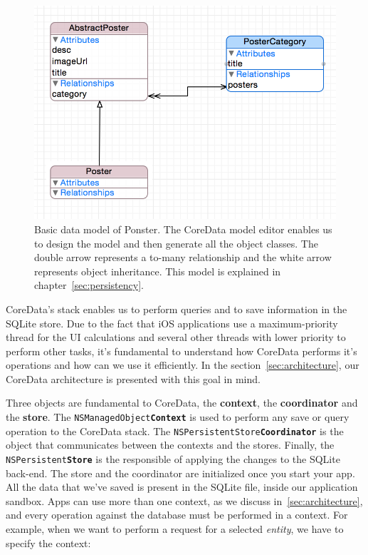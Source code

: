 \begin{figure}
\centering
\includegraphics[scale=0.85]{img/coredata.png}
\caption{\label{fig:coredata}Basic data model of Ponster. The CoreData model editor
  enables us to design the model and then generate all the object classes. The
  double arrow represents a to-many relationship and the white arrow represents
  object inheritance. This model is explained in chapter~\ref{sec:persistency}.}
\end{figure} 

CoreData's stack enables us to perform queries and to save information in the SQLite
store. Due to the fact that iOS applications use a maximum-priority thread for the
UI calculations and several other threads with lower priority to perform other
tasks, it's fundamental to understand how CoreData performs it's operations and how
can we use it efficiently. In the section~\ref{sec:architecture}, our CoreData
architecture is presented with this goal in mind.

Three objects are fundamental to CoreData, the \textbf{context}, the \textbf{coordinator}
and the \textbf{store}. The \texttt{NSManagedObject\textbf{Context}} is used to perform
any save or query operation to the CoreData stack. The
\texttt{NSPersistentStore\textbf{Coordinator}} is the object that communicates
between the contexts and the stores. Finally, the
\texttt{NSPersistent\textbf{Store}} is the responsible of applying the changes to
the SQLite back-end. The store and the coordinator are initialized once you start
your app. All the data that we've saved is present in the SQLite file, inside our
application sandbox. Apps can use more than one context, as we discuss
in~\ref{sec:architecture}, and every operation against the database must be
performed in a context. For example, when we want to perform a request for a
selected \textit{entity}, we have to specify the context:

